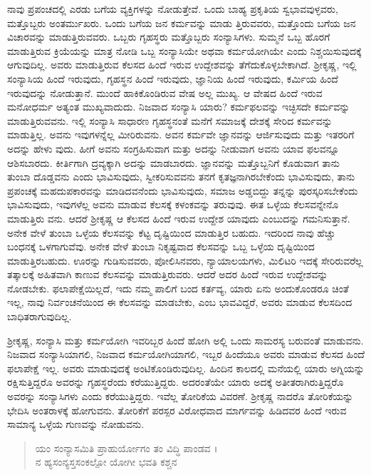 ನಾವು ಪ್ರಪಂಚದಲ್ಲಿ ಎರಡು ಬಗೆಯ ವ್ಯಕ್ತಿಗಳನ್ನು ನೋಡುತ್ತೇವೆ. ಒಂದು ಬಾಹ್ಯ ಪ್ರಕೃತಿಯ ಸ್ವಭಾವವುಳ್ಳವರು, ಮತ್ತೊಬ್ಬರು ಅಂತರ್ಮುಖರು. ಒಂದು ಬಗೆಯ ಜನ ಕರ್ಮವನ್ನು ಮಾಡು ತ್ತಿರುವವರು, ಮತ್ತೊಂದು ಬಗೆಯ ಜನ ವಿಚಾರವನ್ನು ಮಾಡುತ್ತಿರುವವರು. ಒಬ್ಬರು ಗೃಹಸ್ಥರು ಮತ್ತೊಬ್ಬರು ಸಂನ್ಯಾಸಿಗಳು. ಸುಮ್ಮನೆ ಒಬ್ಬ ಹೊರಗೆ ಮಾಡುತ್ತಿರುವ ಕ್ರಿಯೆಯನ್ನು ಮಾತ್ರ ನೋಡಿ ಒಬ್ಬ ಸಂನ್ಯಾಸಿಯೇ ಅಥವಾ ಕರ್ಮಯೋಗಿಯೇ ಎಂದು ನಿಶ್ಚಯಿಸುವುದಕ್ಕೆ ಆಗುವುದಿಲ್ಲ. ಅವರು ಮಾಡುತ್ತಿರುವ ಕೆಲಸದ ಹಿಂದೆ ಇರುವ ಉದ್ದೇಶವನ್ನು ತೆಗೆದುಕೊಳ್ಳಬೇಕಾಗಿದೆ. ಶ್ರೀಕೃಷ್ಣ, ಇಲ್ಲಿ ಸಂನ್ಯಾಸಿಯ ಹಿಂದೆ ಇರುವುದು, ಗೃಹಸ್ಥನ ಹಿಂದೆ ಇರುವುದು, ಜ್ಞಾನಿಯ ಹಿಂದೆ ಇರುವುದು, ಕರ್ಮಿಯ ಹಿಂದೆ ಇರುವುದನ್ನು ನೋಡುತ್ತಾನೆ. ಮುಂದೆ ಹಾಕಿಕೊಂಡಿರುವ ವೇಷ ಅಲ್ಲ ಮುಖ್ಯ. ಆ ವೇಷದ ಹಿಂದೆ ಇರುವ ಮನೋಧರ್ಮ ಅತ್ಯಂತ ಮುಖ್ಯವಾದುದು. ನಿಜವಾದ ಸಂನ್ಯಾಸಿ ಯಾರು? ಕರ್ಮಫಲವನ್ನು ಇಚ್ಛಿಸದೇ ಕರ್ಮವನ್ನು ಮಾಡುತ್ತಿರುವವನು. ಇಲ್ಲಿ ಸಂನ್ಯಾಸಿ ಸಾಧಾರಣ ಗೃಹಸ್ಥನಂತೆ ಮನೆಗೆ ಸಮಾಜಕ್ಕೆ ದೇಶಕ್ಕೆ ಸೇರಿದ ಕರ್ಮವನ್ನು ಮಾಡುತ್ತಿಲ್ಲ. ಅವನು ಇವುಗಳನ್ನೆಲ್ಲ ಮೀರಿರುವನು. ಅವನ ಕರ್ಮವೇ ಜ್ಞಾನವನ್ನು ಆರ್ಜಿಸುವುದು ಮತ್ತು ಇತರರಿಗೆ ಅದನ್ನು ಹೇಳು ವುದು. ಹೀಗೆ ಅವನು ಸಂಗ್ರಹಿಸುವಾಗ ಮತ್ತು ಅದನ್ನು ನೀಡುವಾಗ ಅವನು ಯಾವ ಫಲವನ್ನೂ ಆಶಿಸಬಾರದು. ಕೀರ್ತಿಗಾಗಿ ದ್ರವ್ಯಕ್ಕಾಗಿ ಅದನ್ನು ಮಾಡಬಾರದು. ಜ್ಞಾನವನ್ನು ಮತ್ತೊಬ್ಬನಿಗೆ ಕೊಡುವಾಗ ತಾನು ತುಂಬಾ ದೊಡ್ಡವನು ಎಂದು ಭಾವಿಸುವುದು, ಸ್ವೀಕರಿಸುವವನು ತನಗೆ ಕೃತಜ್ಞನಾಗಿರಬೇಕೆಂದು ಭಾವಿಸುವುದು, ತಾನು ಪ್ರಪಂಚಕ್ಕೆ ಮಹದುಪಕಾರವನ್ನು ಮಾಡಿದವನೆಂದು ಭಾವಿಸುವುದು, ಸಮಾಜ ಅಡ್ಡಬಿದ್ದು ತನ್ನನ್ನು ಪುರಸ್ಕರಿಸಬೇಕೆಂದು ಭಾವಿಸುವುದು, ಇವುಗಳೆಲ್ಲ ಅವನು ಮಾಡುವ ಕೆಲಸಕ್ಕೆ ಕಳಂಕವನ್ನು ತರುವುವು. ಈತ ಒಳ್ಳೆಯ ಕೆಲಸವನ್ನೇನೊ ಮಾಡುತ್ತಿರು ವನು. ಆದರೆ ಶ್ರೀಕೃಷ್ಣ ಆ ಕೆಲಸದ ಹಿಂದೆ ಇರುವ ಉದ್ದೇಶ ಯಾವುದು ಎಂಬುದನ್ನು ಗಮನಿಸುತ್ತಾನೆ. ಅನೇಕ ವೇಳೆ ತುಂಬಾ ಒಳ್ಳೆಯ ಕೆಲಸವನ್ನು ಕೆಟ್ಟ ದೃಷ್ಟಿಯಿಂದ ಮಾಡುತ್ತಿರ ಬಹುದು. ಇದರಿಂದ ನಾವು ಹೆಚ್ಚು ಬಂಧನಕ್ಕೆ ಒಳಗಾಗುವೆವು. ಅನೇಕ ವೇಳೆ ತುಂಬಾ ನಿಕೃಷ್ಟವಾದ ಕೆಲಸವನ್ನು ಒಬ್ಬ ಒಳ್ಳೆಯ ದೃಷ್ಟಿಯಿಂದ ಮಾಡುತ್ತಿರಬಹುದು. ಊರನ್ನು ಗುಡಿಸುವವರು, ಪೋಲಿಸಿನವರು, ನ್ಯಾಯಾಲಯಗಳು, ಮಿಲಿಟರಿ ಇದಕ್ಕೆ ಸೇರಿರುವರೆಲ್ಲ ತತ್ಕಾಲಕ್ಕೆ ಅಹಿತವಾಗಿ ಕಾಣುವ ಕೆಲಸವನ್ನು ಮಾಡುತ್ತಿರುವರು. ಆದರೆ ಅದರ ಹಿಂದೆ ಇರುವ ಉದ್ದೇಶವನ್ನು ನೋಡಬೇಕು. ಫಲಾಪೇಕ್ಷೆಯಿಲ್ಲದೆ, ಇದು ನಮ್ಮ ಪಾಲಿಗೆ ಬಂದ ಕರ್ತವ್ಯ, ಯಾರು ಏನು ಅಂದುಕೊಂಡರೂ ಚಿಂತೆ ಇಲ್ಲ, ನಾವು ನಿರ್ವಂಚನೆಯಿಂದ ಈ ಕೆಲಸವನ್ನು ಮಾಡಬೇಕು, ಎಂಬ ಭಾವವಿದ್ದರೆ, ಅವರು ಮಾಡುವ ಕೆಲಸದಿಂದ ಬಾಧಿತರಾಗುವುದಿಲ್ಲ.

ಶ್ರೀಕೃಷ್ಣ, ಸಂನ್ಯಾಸಿ ಮತ್ತು ಕರ್ಮಯೋಗಿ ಇವರಿಬ್ಬರ ಹಿಂದೆ ಹೋಗಿ ಅಲ್ಲಿ ಒಂದು ಸಾಮರಸ್ಯ ಬರುವಂತೆ ಮಾಡುವನು. ನಿಜವಾದ ಸಂನ್ಯಾಸಿಯಾಗಲಿ, ನಿಜವಾದ ಕರ್ಮಯೋಗಿಯಾಗಲಿ, ಇಬ್ಬರ ಹಿಂದೆಯೂ ಅವರು ಮಾಡುವ ಕೆಲಸದ ಹಿಂದೆ ಫಲಾಪೇಕ್ಷೆ ಇಲ್ಲ. ಅವರು ಮಾಡುವುದಕ್ಕೆ ಅಂಟಿಕೊಂಡಿರುವುದಿಲ್ಲ. ಹಿಂದಿನ ಕಾಲದಲ್ಲಿ ಮನೆಯಲ್ಲಿ ಯಾರು ಅಗ್ನಿಯನ್ನು ರಕ್ಷಿಸುತ್ತಿದ್ದರೊ ಅವರನ್ನು ಗೃಹಸ್ಥರೆಂದು ಕರೆಯುತ್ತಿದ್ದರು. ಅದರಂತೆಯೇ ಯಾರು ಅದಕ್ಕೆ ಅತೀತರಾಗಿರುತ್ತಿದ್ದರೊ ಅವರನ್ನು ಸಂನ್ಯಾಸಿಗಳು ಎಂದು ಕರೆಯುತ್ತಿದ್ದರು. ಇವೆಲ್ಲ ತೋರಿಕೆಯ ವಿವರಣೆ. ಶ್ರೀಕೃಷ್ಣ ನಾದರೊ ತೋರಿಕೆಯನ್ನು ಭೇದಿಸಿ ಅಂತರಾಳಕ್ಕೆ ಹೋಗುವನು. ತೋರಿಕೆಗೆ ಪರಸ್ಪರ ವಿರೋಧವಾದ ಮಾರ್ಗವನ್ನು ಹಿಡಿದವರ ಹಿಂದೆ ಇರುವ ಸಾಮಾನ್ಯ ಒಳ್ಳೆಯ ಗುಣವನ್ನು ನೋಡುವನು.

\begin{verse}
ಯಂ ಸಂನ್ಯಾಸಮಿತಿ ಪ್ರಾಹುರ್ಯೋಗಂ ತಂ ವಿದ್ಧಿ ಪಾಂಡವ ।\\ನ ಹ್ಯಸಂನ್ಯಸ್ತಸಂಕಲ್ಪೋ ಯೋಗೀ ಭವತಿ ಕಶ್ಚನ 
\end{verse}


